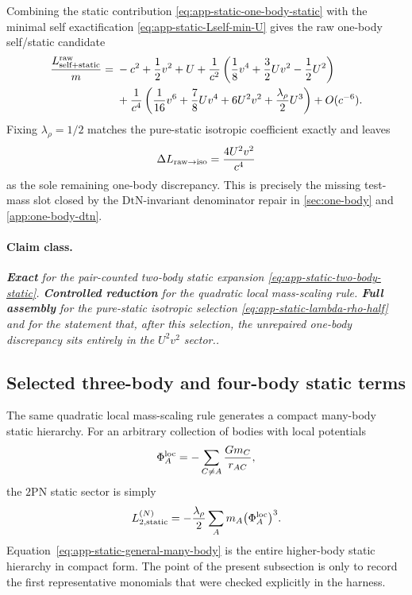 \documentclass[11pt]{article}
\newcommand{\TwoPN}{\mathrm{2PN}}
\newcommand{\DtN}{\mathrm{DtN}}
\newcommand{\Exact}{\textbf{Exact}}
\newcommand{\Controlled}{\textbf{Controlled reduction}}
\newcommand{\FullMatch}{\textbf{Full assembly}}
\newcommand{\claimclass}[1]{\paragraph{Claim class.}\emph{#1.}}
\begin{document}
Combining the static contribution \cref{eq:app-static-one-body-static} with the minimal
self exactification \cref{eq:app-static-Lself-min-U} gives the raw one-body self/static
candidate
\begin{align}
\frac{L_{\rm self+static}^{\rm raw}}{m}
={}&-c^2+\frac12v^2+U
+\frac{1}{c^2}\left(\frac18v^4+\frac32Uv^2-\frac12U^2\right)
\nonumber\\
&+\frac{1}{c^4}\left(\frac1{16}v^6+\frac78Uv^4+6U^2v^2+\frac{\lambda_\rho}{2}U^3\right)
+O(c^{-6}).
\label{eq:app-static-self-static-raw}
\end{align}
Fixing \(\lambda_\rho=1/2\) matches the pure-static isotropic coefficient exactly and leaves
\begin{equation}
\Delta L_{\rm raw\to iso}
=\frac{4U^2v^2}{c^4}
\label{eq:app-static-residual-4u2v2}
\end{equation}
as the sole remaining one-body discrepancy.  This is precisely the missing test-mass slot
closed by the \(\DtN\)-invariant denominator repair in \cref{sec:one-body} and
\cref{app:one-body-dtn}.

\claimclass{\Exact{} for the pair-counted two-body static expansion
\cref{eq:app-static-two-body-static}. \Controlled{} for the quadratic local mass-scaling
rule. \FullMatch{} for the pure-static isotropic selection
\cref{eq:app-static-lambda-rho-half} and for the statement that, after this selection,
the unrepaired one-body discrepancy sits entirely in the \(U^2v^2\) sector.}

\subsection{Selected three-body and four-body static terms}
\label{app:static-higher-body}

The same quadratic local mass-scaling rule generates a compact many-body static hierarchy.
For an arbitrary collection of bodies with local potentials
\begin{equation}
\Phi_A^{\rm loc}=-\sum_{C\neq A}\frac{Gm_C}{r_{AC}},
\label{eq:app-static-local-potential-general}
\end{equation}
the \(\TwoPN\) static sector is simply
\begin{equation}
L_{2,\rm static}^{(N)}
=-\frac{\lambda_\rho}{2}\sum_A m_A\bigl(\Phi_A^{\rm loc}\bigr)^3.
\label{eq:app-static-general-many-body}
\end{equation}
Equation~\eqref{eq:app-static-general-many-body} is the entire higher-body static
hierarchy in compact form.  The point of the present subsection is only to record the
first representative monomials that were checked explicitly in the harness.
\end{document}
